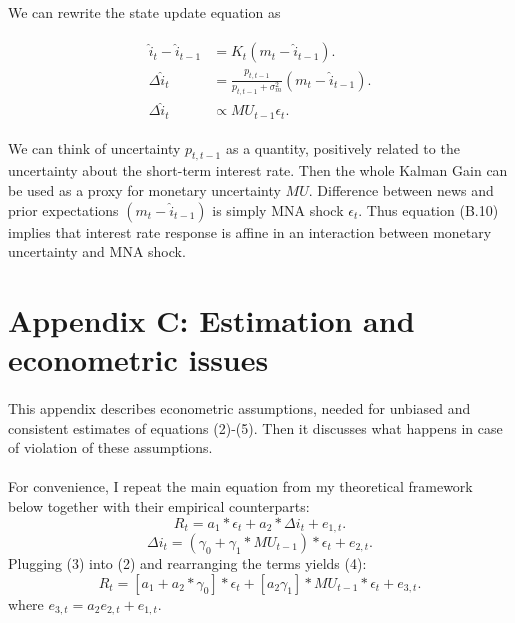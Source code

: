 \documentclass[12pt]{article}
\begin{document}
\paragraph{}
We can rewrite the state update equation as

\begin{align}
\begin{split}
\hat{i}_t - \hat{i}_{t-1} & = K_t (m_t - \hat{i}_{t-1}). \\
\Delta \hat{i}_t & = \frac{p_{t,t-1}}{p_{t,t-1}+\sigma^2_{m}} (m_t - \hat{i}_{t-1}). \\
\Delta \hat{i}_t & \propto MU_{t-1} \epsilon_t.
\end{split}
\end{align}

We can think of uncertainty ${p_{t,t-1}}$ as a quantity, positively related to the uncertainty about the short-term interest rate. Then the whole Kalman Gain can be used as a proxy for monetary uncertainty $MU$. Difference between news and prior expectations $(m_t - \hat{i}_{t-1})$ is simply MNA shock $\epsilon_t$. Thus equation (B.10) implies that interest rate response is affine in an interaction between monetary uncertainty and MNA shock.

\pagebreak
\clearpage

\section{Appendix C: Estimation and econometric issues} \label{sec:Model}
\setcounter{equation}{0}
\renewcommand{\theequation}{C\thechapter.\arabic{equation}}

\paragraph{}
This appendix describes econometric assumptions, needed for unbiased and consistent estimates of equations (2)-(5). Then it discusses what happens in case of violation of these assumptions.
\paragraph{}
For convenience, I repeat the main equation from my theoretical framework below together with their empirical counterparts:
\begin{equation}
    R_t = a_1*\epsilon_t + a_2*\Delta i_t + e_{1,t}.
\end{equation}
\begin{equation}
    \Delta i_t = (\gamma_0 + \gamma_1*MU_{t-1})*\epsilon_t + e_{2,t}.
\end{equation}
Plugging (3) into (2) and rearranging the terms yields (4):
\begin{equation}
    R_t = [a_1+a_2*\gamma_0]*\epsilon_t + [a_2\gamma_1]*MU_{t-1}*\epsilon_t + e_{3,t}.
\end{equation}
where $e_{3,t} = a_2e_{2,t}+e_{1,t}.$ 
\end{document}
